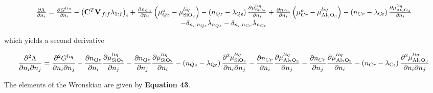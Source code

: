 \documentclass[11pt, titlepage, twoside]{article}
\begin{document}
\begin{MPEquation}[!ht]
\begin{equation}
\begin{array}{c}
\frac{{\partial \Lambda }}{{\partial {n_i}}} = \frac{{\partial {G^{liq}}}}{{\partial {n_i}}} - {\left( {{{\bf{C}}^T}{{\bf{V}}_{\left. f \right|f}}{\lambda _{1:f}}} \right)_i} + \frac{{\partial {n_{Qz}}}}{{\partial {n_i}}}\left( {\mu _{Qz}^o - \mu _{{\rm{Si}}{{\rm{O}}_2}}^{liq}} \right) - \left( {{n_{Qz}} - {\lambda _{{\rm{Qz}}}}} \right)\frac{{\partial \mu _{{\rm{Si}}{{\rm{O}}_2}}^{liq}}}{{\partial {n_i}}} + \frac{{\partial {n_{Cr}}}}{{\partial {n_i}}}\left( {\mu _{Cr}^o - \mu _{{\rm{A}}{{\rm{l}}_2}{{\rm{O}}_3}}^{liq}} \right) - \left( {{n_{Cr}} - {\lambda _{{\rm{Cr}}}}} \right)\frac{{\partial \mu _{{\rm{A}}{{\rm{l}}_2}{{\rm{O}}_3}}^{liq}}}{{\partial {n_i}}}\\
 - {\delta _{{n_i},{n_{Qz}}}}{\lambda _{{n_{Qz}}}} - {\delta _{{n_i},{n_{Cr}}}}{\lambda _{{n_{Cr}}}}
\end{array}
\end{equation}
\label{MPEquationElement:5C54AEEA-2EDE-4E23-D3A9-5B0F9EA8321C}
\end{MPEquation}
which yields a second derivative


\begin{MPEquation}[!ht]
\begin{equation}
\frac{{{\partial ^2}\Lambda }}{{\partial {n_i}\partial {n_j}}} = \frac{{{\partial ^2}{G^{liq}}}}{{\partial {n_i}\partial {n_j}}} - \frac{{\partial {n_{Qz}}}}{{\partial {n_i}}}\frac{{\partial \mu _{{\rm{Si}}{{\rm{O}}_2}}^{liq}}}{{\partial {n_j}}} - \frac{{\partial {n_{Qz}}}}{{\partial {n_j}}}\frac{{\partial \mu _{{\rm{Si}}{{\rm{O}}_2}}^{liq}}}{{\partial {n_i}}} - \left( {{n_{Qz}} - {\lambda _{{\rm{Qz}}}}} \right)\frac{{{\partial ^2}\mu _{{\rm{Si}}{{\rm{O}}_2}}^{liq}}}{{\partial {n_i}\partial {n_j}}} - \frac{{\partial {n_{Cr}}}}{{\partial {n_i}}}\frac{{\partial \mu _{{\rm{A}}{{\rm{l}}_2}{{\rm{O}}_3}}^{liq}}}{{\partial {n_j}}} - \frac{{\partial {n_{Cr}}}}{{\partial {n_j}}}\frac{{\partial \mu _{{\rm{A}}{{\rm{l}}_2}{{\rm{O}}_3}}^{liq}}}{{\partial {n_i}}} - \left( {{n_{Cr}} - {\lambda _{{\rm{Cr}}}}} \right)\frac{{{\partial ^2}\mu _{{\rm{A}}{{\rm{l}}_2}{{\rm{O}}_3}}^{liq}}}{{\partial {n_i}\partial {n_j}}}
\end{equation}
\label{MPEquationElement:9AB7B596-467B-4C00-C417-95BFC9EA2A29}
\end{MPEquation}
The elements of the Wronskian are given by \textbf{Equation 43}.
\end{document}
